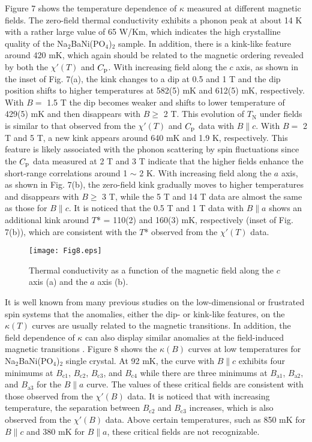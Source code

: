 \documentclass[aps,twocolumn,superscriptaddress,showpacs]{revtex4-1}
\begin{document}
Figure 7 shows the temperature dependence of $\kappa$ measured at different magnetic fields. The zero-field thermal conductivity exhibits a phonon peak at about 14 K with a rather large value of 65 W/Km, which indicates the high crystalline quality of the Na$_2$BaNi(PO$_4$)$_2$ sample. In addition, there is a kink-like feature around 420 mK, which again should be related to the magnetic ordering revealed by both the $\chi'(T)$ and $C\rm_{p}$. With increasing field along the $c$ axis, as shown in the inset of Fig. 7(a), the kink changes to a dip at 0.5 and 1 T and the dip position shifts to higher temperatures at 582(5) mK and 612(5) mK, respectively. With $B =$ 1.5 T the dip becomes weaker and shifts to lower temperature of 429(5) mK and then disappears with $B \geq$ 2 T. This evolution of $T_{\text{N}}$ under fields is similar to that observed from the $\chi'(T)$ and $C\rm_{p}$ data with $B \parallel c$. With $B =$ 2 T and 5 T, a new kink appears around 640 mK and 1.9 K, respectively. This feature is likely associated with the phonon scattering by spin fluctuations since the $C\rm_{p}$ data measured at 2 T and 3 T indicate that the higher fields enhance the short-range correlations around 1 $\sim$ 2 K. With increasing field along the $a$ axis, as shown in Fig. 7(b), the zero-field kink gradually moves to higher temperatures and disappears with $B\geq$ 3 T, while the 5 T and 14 T data are almost the same as those for $B \parallel c$. It is noticed that the 0.5 T and 1 T data with $B \parallel a$ shows an additional kink around $T$* = 110(2) and 160(3) mK, respectively (inset of Fig. 7(b)), which are consistent with the $T$* observed from the $\chi'(T)$ data.


\begin{figure}
\texttt{[image: Fig8.eps]}
\caption{Thermal conductivity as a function of the magnetic field along the $c$ axis (a) and the $a$ axis (b).}
\label{kappaH}
\end{figure}

It is well known from many previous studies on the low-dimensional or frustrated spin systems that the anomalies, either the dip- or kink-like features, on the $\kappa(T)$ curves are usually related to the magnetic transitions. In addition, the field dependence of $\kappa$ can also display similar anomalies at the field-induced magnetic transitions \cite{PhysRevB.103.184425, li2020possible, Rao_YMGO, Song_CFO, Leahy, Hentrich, Buys}. Figure 8 shows the $\kappa(B)$ curves at low temperatures for Na$_2$BaNi(PO$_4$)$_2$ single crystal. At 92 mK, the curve with $B \parallel c$ exhibits four minimums at $B_{\text{c1}}$, $B_{\text{c2}}$, $B_{\text{c3}}$, and $B_{\text{c4}}$ while there are three minimums at $B_{\text{a1}}$, $B_{\text{a2}}$, and $B_{\text{a3}}$ for the $B \parallel a$ curve. The values of these critical fields are consistent with those observed from the $\chi'(B)$ data. It is noticed that with increasing temperature, the separation between $B_{\text{c2}}$ and $B_{\text{c3}}$ increases, which is also observed from the $\chi'(B)$ data. Above certain temperatures, such as 850 mK for $B \parallel c$ and 380 mK for $B \parallel a$, these critical fields are not recognizable.
\end{document}
